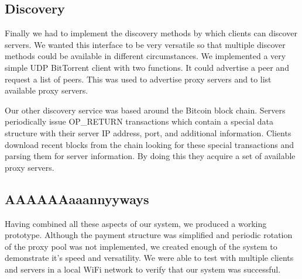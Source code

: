 \subsection{Discovery}
Finally we had to implement the discovery methods by which clients can discover servers. We wanted this interface to be very versatile so that multiple discover methods could be available in different circumstances. We implemented a very simple UDP BitTorrent client with two functions. It could advertise a peer and request a list of peers. This was used to advertise proxy servers and to list available proxy servers.

Our other discovery service was based around the Bitcoin block chain. Servers periodically issue OP\_RETURN transactions which contain a special data structure with their server IP address, port, and additional information. Clients download recent blocks from the chain looking for these special transactions and parsing them for server information. By doing this they acquire a set of available proxy servers.


\subsection{AAAAAAaaannyyways}


Having combined all these aspects of our system, we produced a working prototype. Although the payment structure was simplified and periodic rotation of the proxy pool was not implemented, we created enough of the system to demonstrate it's speed and versatility. We were able to test with multiple clients and servers in a local WiFi network to verify that our system was successful.